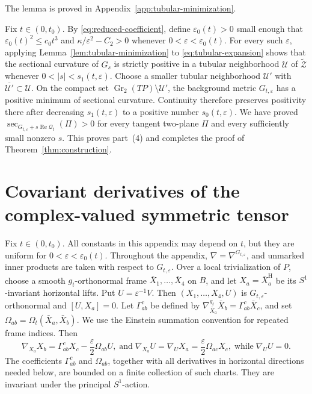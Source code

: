 \documentclass[11pt]{article}
\theoremstyle{definition}
\theoremstyle{remark}
\newcommand{\tZ}{\widetilde{\mathcal Z}}
\newcommand{\Gr}{\operatorname{Gr}}
\newcommand{\eps}{\varepsilon}
\begin{document}
The lemma is proved in Appendix~\ref{app:tubular-minimization}.

Fix $t\in(0,t_0)$.  By \eqref{eq:reduced-coefficient}, define
$\eps_0(t)>0$ small enough that
$\eps_0(t)^2\leq c_0t^3$ and
$\kappa/\eps^2-C_2>0$ whenever $0<\eps<\eps_0(t)$.  For every such
$\eps$, applying
Lemma~\ref{lem:tubular-minimization} to
\eqref{eq:tubular-expansion} shows that the sectional curvature of $G_s$ is
strictly positive in a tubular neighborhood $\mathcal U$ of $\tZ$ whenever
$0<|s|<s_1(t,\eps)$.  Choose a smaller tubular neighborhood
$\mathcal U'$ with $\overline{\mathcal U'}\subset\mathcal U$.  On the compact
set $\Gr_2(TP)\setminus\mathcal U'$, the background metric $G_{t,\eps}$ has a
positive minimum of sectional curvature.  Continuity therefore preserves
positivity there after decreasing $s_1(t,\eps)$ to a positive number
$s_0(t,\eps)$.  We have proved
$\sec_{G_{t,\eps}+s\operatorname{Re}\mathcal Q_t}(\Pi)>0$ for every
tangent two-plane $\Pi$ and every sufficiently small nonzero $s$.
This proves part~(4) and completes the proof of Theorem~\ref{thm:construction}.

\appendix
\section{Covariant derivatives of the complex-valued symmetric tensor}  \label{app:tensor-derivatives}

Fix $t\in(0,t_0)$.  All constants in this appendix may depend on $t$, but
they are uniform for $0<\eps<\eps_0(t)$.  Throughout the appendix,
$\nabla=\nabla^{G_{t,\eps}}$, and unmarked inner products are taken with
respect to $G_{t,\eps}$.  Over a local trivialization of $P$, choose a smooth
$g_t$-orthonormal frame
$\bar X_1,\ldots,\bar X_4$ on $B$, and let
$X_a=\bar X_a^{\mathrm H}$ be its $S^1$-invariant horizontal lifts.  Put
$U=\eps^{-1}V$.  Then $(X_1,\ldots,X_4,U)$ is
$G_{t,\eps}$-orthonormal and $[U,X_a]=0$.  Let
$\Gamma_{ab}^{c}$ be defined by
$\nabla_{\bar X_a}^{g_t}\bar X_b=\Gamma_{ab}^{c}\bar X_c$, and set
$\Omega_{ab}=\Omega_t(\bar X_a,\bar X_b)$.  We use the Einstein summation
convention for repeated frame indices.  Then
\begin{equation}                                                                    \label{eq:appendix-frame-connection}
 \nabla_{X_a}X_b=\Gamma_{ab}^{c}X_c-\frac\eps2\Omega_{ab}U,
 \;\text{and}\;
 \nabla_{X_a}U=\nabla_U X_a=\frac\eps2\Omega_{ac}X_c,
 \;\text{while}\;
 \nabla_U U=0.
\end{equation}
The coefficients $\Gamma_{ab}^{c}$ and $\Omega_{ab}$, together with all
derivatives in horizontal directions needed below, are bounded on a finite
collection of such charts.  They are invariant under the principal $S^1$-action.
\end{document}
